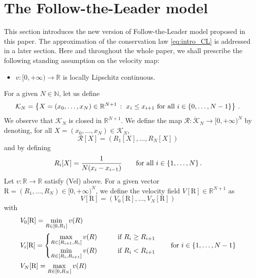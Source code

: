 \documentclass[reqno,oneside]{amsart}
\theoremstyle{plain}
\newcommand{\R}{\mathbb{R}}
\newcommand{\N}{\mathbb{N}}
\begin{document}
\section{The Follow-the-Leader model}\label{sec:scheme}
This section introduces the new version of Follow-the-Leader model proposed in this paper. The approximation of the conservation law \eqref{eq:intro_CL} is addressed in a later section. Here and throughout the whole paper, we shall prescribe the following standing assumption on the velocity map:
\begin{itemize}
    \item [(Vel)] $v:[0,+\infty)\rightarrow \R$ is locally Lipschitz continuous.
\end{itemize}
For a given $N\in \N$, let us define
\[\mathcal{K}_N=\left\{X=(x_0,\ldots,x_N)\in \R^{N+1}\,:\,\, \hbox{$x_i\leq x_{i+1}$ for all $i\in\{0,\ldots,N-1\}$}\right\}\,.
\]
We observe that $\mathcal{K}_N$ is closed in $\R^{N+1}$. We define the map $\mathcal{R}:\mathring{\mathcal{K}}_N\rightarrow [0,+\infty)^N$ by denoting, for all $X=(x_0,\ldots,x_N)\in \mathcal{K}_N$,
\begin{equation}\label{eq:R1}
    \mathcal{R}[X]=(R_1[X],\ldots,R_N[X])
\end{equation}
and by defining
\begin{equation}\label{eq:R2}
    R_i[X]=\frac{1}{N(x_i-x_{i-1})}\qquad \hbox{for all $i\in\{1,\ldots,N\}$}\,.
\end{equation}
Let $v:\R\rightarrow \R$ satisfy (Vel) above. For a given vector $\mathrm{R}=(R_1,\ldots,R_N)\in [0,+\infty)^N$, we define the velocity field $V[\mathrm{R}]\in \R^{N+1}$ as
\[V[\mathrm{R}]=(V_0[\mathrm{R}],\ldots,V_N[\mathrm{R}])\]
with
\begin{align*}
    & V_0[\mathrm{R}]=\min_{R\in [0,R_1]}v(R)\\
    & V_i[\mathrm{R}]=\begin{cases}
\displaystyle{\max_{R\in[R_{i+1},R_i]}v(R)} & \qquad\hbox{if $R_i\geq R_{i+1}$}\\
        \displaystyle{\min_{R\in [R_i,R_{i+1}]}v(R)} &\qquad \hbox{if $R_i<R_{i+1}$}
    \end{cases} \qquad\hbox{for $i\in \{1,\ldots,N-1\}$}\\
    & V_N[\mathrm{R}]=\max_{R\in [0,R_N]}v(R)
\end{align*}
\end{document}
